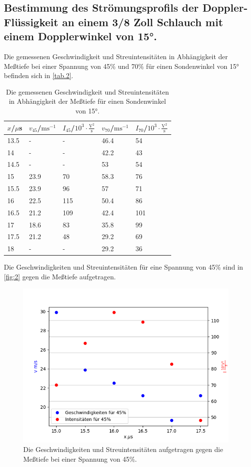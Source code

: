\subsection{Bestimmung des Strömungsprofils der Doppler-Flüssigkeit an einem 3/8 Zoll Schlauch
mit einem Dopplerwinkel von 15°.}
Die gemessenen Geschwindigkeit und Streuintensitäten in Abhängigkeit der Meßtiefe bei einer Spannung von 45$\%$ und 70$\%$ für einen Sondenwinkel von 15° befinden sich in \autoref{tab.2}.
\begin{table}[H]
  \centering
  \caption{Die gemessenen Geschwindigkeit und Streuintensitäten in Abhängigkeit der Meßtiefe für einen Sondenwinkel von 15°.}
  \begin{tabular}{l|l|l|l|l}
  $x$/$\mu$s & $v_{45}$/$\textrm{ms}^{-1}$ & $I_{45}$/$10^3\cdot\frac{\textrm{V}^2}{\textrm{s}}$ & $v_{70}$/$\textrm{ms}^{-1}$ & $I_{70}$/$10^3\cdot\frac{\textrm{V}^2}{\textrm{s}}$\\\hline
  13.5 & - & - & 46.4 & 54\\
  14 & - & - & 42.2 & 43\\
  14.5 & - & - & 53 & 54\\
  15 & 23.9 & 70 & 58.3 & 76\\
  15.5 & 23.9 & 96 & 57 & 71\\
  16 & 22.5 & 115 & 50.4 & 86\\
  16.5 & 21.2 & 109 & 42.4 & 101\\
  17 & 18.6 & 83 & 35.8 & 99\\
  17.5 & 21.2 & 48 & 29.2 & 69\\
  18 & - & - & 29.2 & 36\\
  \end{tabular}
  \label{tab.2}
\end{table}
Die Geschwindigkeiten und Streuintensitäten für eine Spannung von 45$\%$ sind in \autoref{fig:2} gegen die Meßtiefe aufgetragen.
\begin{figure}[H]
  \centering
  \includegraphics[width=12cm]{content/2}
  \caption{Die Geschwindigkeiten und Streuintensitäten aufgetragen gegen die Meßtiefe bei einer Spannung von 45$\%$.}
  \label{fig:2}
\end{figure}
